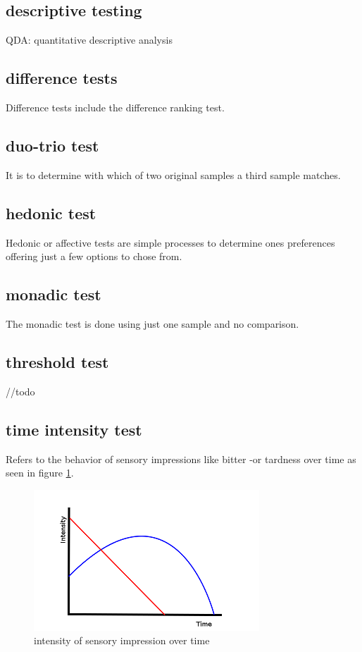 \documentclass[]{scrartcl}
\begin{document}
\subsection{descriptive testing}
QDA: quantitative descriptive analysis

\subsection{difference tests}
Difference tests include the difference ranking test.

\subsection{duo-trio test}
It is to determine with which of two original samples a third sample matches.

\subsection{hedonic test}
Hedonic or affective tests are simple processes to determine ones preferences offering
just a few options to chose from.

\subsection{monadic test}
The monadic test is done using just one sample and no comparison.

\subsection{threshold test}
//todo

\subsection{time intensity test}
Refers to the behavior of sensory impressions like bitter -or tardness over time
as seen in figure \ref{fig:time-intensity}.
\begin{figure}[h]
	\centering
	\includegraphics{time-intensity.png}
	\caption{intensity of sensory impression over time}
	\label{fig:time-intensity}
\end{figure}
\end{document}
